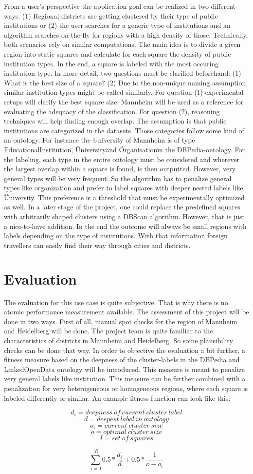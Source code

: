 From a user's perspective the application goal can be realized in two different ways. (1) Regional districts are getting clustered by their type of public institutions or (2) the user searches for a generic type of institutions and an algorithm searches on-the-fly for regions with a high density of those. Technically, both scenarios rely on similar computations. The main idea is to divide a given region into static squares and calculate for each square the density of public institution types. In the end, a square is labeled with the most occuring institution-type. In more detail, two questions must be clarified beforehand: (1) What is the best size of a square? (2) Due to the non-unique naming assumption, similar institution types might be called similarly. For question (1) experimental setups will clarify the best square size. Mannheim will be used as a reference for evaluating the adequacy of the classification. For question (2), reasoning techniques will help finding enough overlap. The assumption is that public institutions are categorized in the datasets. Those categories follow some kind of an ontology. For instance the University of Mannheim is of type \"EducationalInstitution\", \"University\" and \"Organisation\" in the DBPedia-ontology. For the labeling, each type in the entire ontology must be considered and wherever the largest overlap within a square is found, is then outputted. However, very general types will be very frequent. So the algorithm has to penalize general types like organization and prefer to label squares with deeper nested labels like \"University\". This preference is a threshold that must be experimentally optimized as well. In a later stage of the project, one could replace the predefined squares with arbitrarily shaped clusters using a DBScan algorithm. However, that is just a nice-to-have addition. In the end the outcome will always be small regions with labels depending on the type of institutions. With that information foreign travellers can easily find their way through cities and districts. 


\section{Evaluation}

The evaluation for this use case is quite subjective. That is why there is no atomic performance measurement available. The assessment of this project will be done in two ways. First of all, manual spot checks for the region of Mannheim and Heidelberg will be done. The project team is quite familiar to the characteristics of districts in Mannheim and Heidelberg. So some plausibility checks can be done that way. In order to objective the evaluation a bit further, a fitness measure based on the deepness of the cluster-labels in the DBPedia and LinkedOpenData ontology will be introduced. This measure is meant to penalize very general labels like institution. This measure can be further combined with a penalization for very heterogeneous or homogeneous regions, where each square is labeled differently or similar. An example fitness function can look like this:

\[d_i = deepness~of~current~cluster~label \]
\[d = deepest~label~in~ontology \]
\[o_i = current~cluster~size \]
\[o = optimal~cluster~size \]
\[I = set~of~squares \]

\[\sum_{i=0}^{|I|} 0.5 * \frac{d_i}{d} + 0.5 * \frac{1}{ o - o_i }\]


